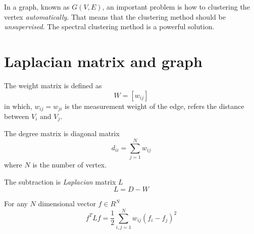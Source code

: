 \documentclass[a4paper]{article}
\begin{document}
\abstract
In a graph, known as $G(V, E)$, an important problem is how to clustering the vertex \emph{automatically}.
That means that the clustering method should be \emph{unsupervised}.
The spectral clustering method is a powerful solution.

\section {Laplacian matrix and graph}
The weight matrix is defined as
\begin{equation*}
    W = [w_{ij}]
\end{equation*}
in which, $w_{ij}=w_{ji}$ is the measurement weight of the edge, refers the distance between $V_i$ and $V_j$.

The degree matrix is diagonal matrix
\begin{equation*}
    d_{ii} = \sum_{j=1}^{N}w_{ij}
\end{equation*}
where $N$ is the number of vertex.

The subtraction is \emph{Laplacian} matrix $L$
\begin{equation}
    \label{equation: Laplacian matrix}
    L = D - W
\end{equation}

For any $N$ dimensional vector $f \in R^N$
\begin{equation}
    \label{equation: Laplacian matrix times vector}
    f^T L f = \frac{1}{2} \sum_{i, j=1}^{N} w_{ij}(f_i - f_j)^2
\end{equation}
\end{document}
